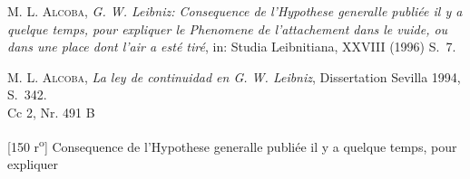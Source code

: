                            \begin{ledgroupsized}[r]{114mm}
                            \footnotesize 
                            \pstart \parindent -6mm
                            \textsc{M. L. Alcoba}, \cite{00189}\textit{G. W. Leibniz: Consequence de l'Hypothese generalle publi\'{e}e il y a quelque temps, pour expliquer le Phenomene de l'attachement dans le vuide, ou dans une place dont l'air a est\'{e} tir\'{e}}, in: Studia Leibnitiana, XXVIII (1996) S.~7.\pend
                            \end{ledgroupsized}         
                            \begin{ledgroupsized}[r]{114mm}
                            \footnotesize 
                            \pstart \parindent -6mm
                            \textsc{M. L. Alcoba}, \cite{00190}\textit{La ley de continuidad en G. W. Leibniz}, Dissertation Sevilla 1994, S.~342.\\Cc 2, Nr. 491 B \pend
                            \end{ledgroupsized}
                \clearpage
                \pstart 
                \normalsize
            [150 r\textsuperscript{o}] Consequence de l'Hypothese generalle  publi\'{e}e il y a quelque temps, pour expliquer \pend 
